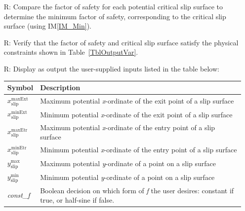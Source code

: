 \documentclass[12pt]{article}
\renewcommand{\arraystretch}{1}
\newcommand{\iref}[1]{IM\ref{#1}}
\newcounter{reqnum} %
\begin{document}
\begin{itemize}
\item[R\refstepcounter{reqnum}\thereqnum \label{R_Minimize}:] Compare the 
factor of safety for each potential critical slip surface to determine the 
minimum factor of safety, corresponding to the critical slip surface (using 
\iref{IM_Min}).


\item[R\refstepcounter{reqnum}\thereqnum \label{R_VerifyOutput}:] Verify that 
the factor of safety and critical slip surface satisfy the 
physical constraints shown in Table~\ref{TblOutputVar}.

\item[R\refstepcounter{reqnum}\thereqnum \label{R_OutputInputs}:] Display as 
output the user-supplied inputs listed in the table below:
\begin{table}[!h]
	\renewcommand{\arraystretch}{1.5}
	\noindent \begin{tabularx}{1.0\textwidth}{l X} \toprule \textbf{Symbol} &
		\textbf{Description}\\ \midrule
		${x_{\text{slip}}^{\text{maxExt}}}$ & Maximum potential 
		\textit{x}-ordinate of 
		the exit point of a slip surface \\
		${x_{\text{slip}}^{\text{minExt}}}$ & Minimum potential 
		\textit{x}-ordinate of 
		the exit point of a slip surface\\
		${x_{\text{slip}}^{\text{maxEtr}}}$ & Maximum potential 
		\textit{x}-ordinate 
		of 
		the entry point of a slip surface \\
		${x_{\text{slip}}^{\text{minEtr}}}$ & Minimum potential 
		\textit{x}-ordinate 
		of 
		the entry point of a slip surface \\
		${y_{\text{slip}}^{\text{max}}}$ & Maximum potential 
		\textit{y}-ordinate of a point on a slip surface\\
		${y_{\text{slip}}^{\text{min}}}$ & Minimum potential 
		\textit{y}-ordinate of a point on a slip surface \\
		\textit{const\_f} & Boolean decision on which form of \textit{f} 
		the user desires: constant if true, or half-sine if false.\\ 
		\bottomrule
	\end{tabularx}
\end{table}


\end{itemize}
\end{document}
